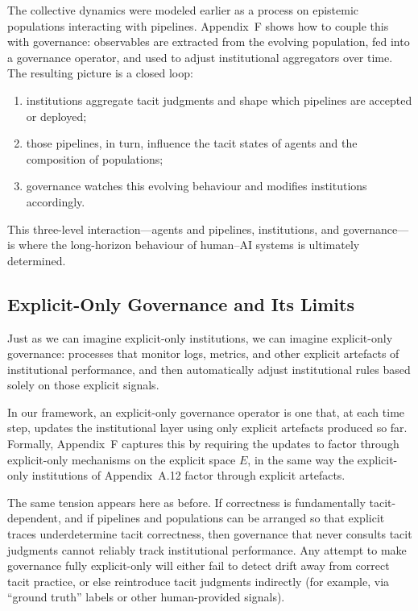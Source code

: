 The collective dynamics were modeled earlier as a process on epistemic populations interacting with pipelines. Appendix~F shows how to couple this with governance: observables are extracted from the evolving population, fed into a governance operator, and used to adjust institutional aggregators over time. The resulting picture is a closed loop:
\begin{enumerate}
  \item institutions aggregate tacit judgments and shape which pipelines are accepted or deployed;
  \item those pipelines, in turn, influence the tacit states of agents and the composition of populations;
  \item governance watches this evolving behaviour and modifies institutions accordingly.
\end{enumerate}
This three-level interaction---agents and pipelines, institutions, and governance---is where the long-horizon behaviour of human--AI systems is ultimately determined.

\subsection{Explicit-Only Governance and Its Limits}

Just as we can imagine explicit-only institutions, we can imagine explicit-only governance: processes that monitor logs, metrics, and other explicit artefacts of institutional performance, and then automatically adjust institutional rules based solely on those explicit signals.

In our framework, an explicit-only governance operator is one that, at each time step, updates the institutional layer using only explicit artefacts produced so far. Formally, Appendix~F captures this by requiring the updates to factor through explicit-only mechanisms on the explicit space $E$, in the same way the explicit-only institutions of Appendix~A.12 factor through explicit artefacts.

The same tension appears here as before. If correctness is fundamentally tacit-dependent, and if pipelines and populations can be arranged so that explicit traces underdetermine tacit correctness, then governance that never consults tacit judgments cannot reliably track institutional performance. Any attempt to make governance fully explicit-only will either fail to detect drift away from correct tacit practice, or else reintroduce tacit judgments indirectly (for example, via ``ground truth'' labels or other human-provided signals).

